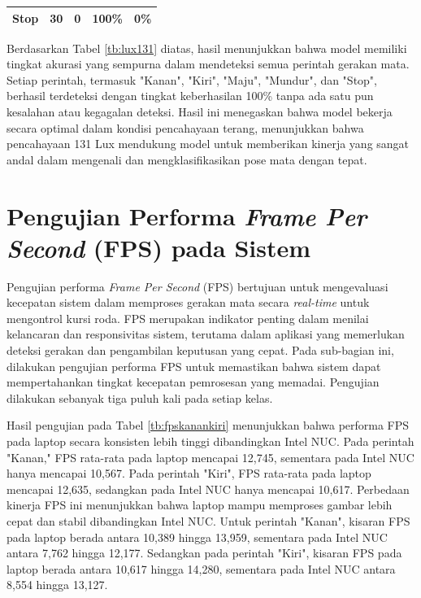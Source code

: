 \begin{longtable}{|l|c|c|c|c|}
  Stop           & 30                                                                                           & 0                                                                                                 & 100\%                                                                                            & 0\%                                                                                                  \\ \hline
\end{longtable}

Berdasarkan Tabel \ref{tb:lux131} diatas, hasil menunjukkan bahwa model memiliki tingkat akurasi yang sempurna dalam mendeteksi semua perintah gerakan mata. Setiap perintah, termasuk "Kanan", "Kiri", "Maju", "Mundur", dan "Stop", berhasil terdeteksi dengan tingkat keberhasilan 100\% tanpa ada satu pun kesalahan atau kegagalan deteksi. Hasil ini menegaskan bahwa model bekerja secara optimal dalam kondisi pencahayaan terang, menunjukkan bahwa pencahayaan 131 Lux mendukung model untuk memberikan kinerja yang sangat andal dalam mengenali dan mengklasifikasikan pose mata dengan tepat.

\section{Pengujian Performa \emph{Frame Per Second} (FPS) pada Sistem}

Pengujian performa \emph{Frame Per Second} (FPS) bertujuan untuk mengevaluasi kecepatan sistem dalam memproses gerakan mata secara \emph{real-time} untuk mengontrol kursi roda. FPS merupakan indikator penting dalam menilai kelancaran dan responsivitas sistem, terutama dalam aplikasi yang memerlukan deteksi gerakan dan pengambilan keputusan yang cepat. Pada sub-bagian ini, dilakukan pengujian performa FPS untuk memastikan bahwa sistem dapat mempertahankan tingkat kecepatan pemrosesan yang memadai. Pengujian dilakukan sebanyak tiga puluh kali pada setiap kelas.

Hasil pengujian pada Tabel \ref{tb:fpskanankiri} menunjukkan bahwa performa FPS pada laptop secara konsisten lebih tinggi dibandingkan Intel NUC. Pada perintah "Kanan," FPS rata-rata pada laptop mencapai 12,745, sementara pada Intel NUC hanya mencapai 10,567. Pada perintah "Kiri", FPS rata-rata pada laptop mencapai 12,635, sedangkan pada Intel NUC hanya mencapai 10,617. Perbedaan kinerja FPS ini menunjukkan bahwa laptop mampu memproses gambar lebih cepat dan stabil dibandingkan Intel NUC. Untuk perintah "Kanan", kisaran FPS pada laptop berada antara 10,389 hingga 13,959, sementara pada Intel NUC antara 7,762 hingga 12,177. Sedangkan pada perintah "Kiri", kisaran FPS pada laptop berada antara 10,617 hingga 14,280, sementara pada Intel NUC antara 8,554 hingga 13,127.

